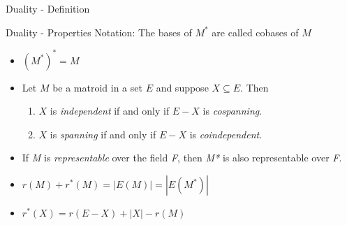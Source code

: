 \documentclass{beamer}
\begin{document}
\begin{frame}[fragile]{Duality - Definition}
\begin{center}
\end{center}

\begin{center}
\end{center}

\end{frame}

\begin{frame}{Duality - Properties}
Notation: The bases of $M^*$ are called cobases of $M$
    \begin{itemize}[<+->]
        \item $(M^*)^* = M$
        \item Let $M$ be a matroid in a set $E$ and suppose $X \subseteq E$. Then
            \begin{enumerate}
                \item $X$ is \textit{independent} if and only if $E-X$ is \textit{cospanning}.
                \item $X$ is \textit{spanning} if and only if $E-X$ is \textit{coindependent}.
            \end{enumerate}
        \item If \textit{M} is \textit{representable} over the field \textit{F}, then \textit{M*} is also representable over \textit{F}. 
        \item $r(M) + r^*(M) = |E(M)| = |E(M^*)|$
        \item $r^*(X) = r(E - X) + |X| - r(M)$
    \end{itemize}    
\end{frame}

\end{document}
